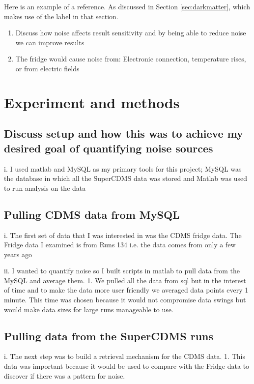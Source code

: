 Here is an example of a reference.  As discussed in Section \ref{sec:darkmatter}, which makes use of the label in that section.

\begin{enumerate}
  \item	Discuss how noise affects result sensitivity and by being able to reduce noise we can improve results

  \item The fridge would cause noise from: Electronic connection, temperature rises, or from electric fields
\end{enumerate}

\section{Experiment and methods}

\subsection{Discuss setup and how this was to achieve my desired goal of quantifying noise sources}
i.	I used matlab and MySQL as my primary tools for this project; MySQL was the database in which all the SuperCDMS data was stored and Matlab was used to run analysis on the data

\subsection{Pulling CDMS data from MySQL}
i.	The first set of data that I was interested in was the CDMS fridge data. The Fridge data I examined is from Runs 134 i.e. the data comes from only a few years ago

ii.	I wanted to quantify noise so I built scripts in matlab to pull data from the MySQL and average them.
1.	We pulled all the data from sql but in the interest of time and to make the data more user friendly we averaged data points every 1 minute. This time was chosen because it would not compromise data swings but would make data sizes for large runs manageable to use.

\subsection{Pulling data from the SuperCDMS runs}
i.	The next step was to build a retrieval mechanism for the CDMS data.
1.	This data was important because it would be used to compare with the Fridge data to discover if there was a pattern for noise.

